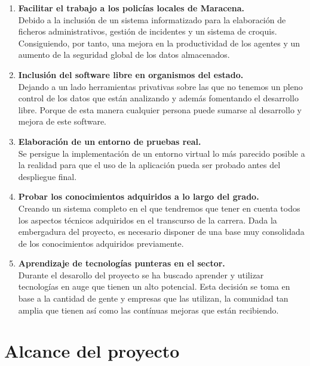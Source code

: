 \begin{enumerate}

    \item \textbf{Facilitar el trabajo a los policías locales de Maracena.}\\
    Debido a la inclusión de un sistema informatizado para la elaboración de 
    ficheros administrativos, gestión de incidentes y un sistema de croquis. Consiguiendo,
    por tanto, una mejora en la productividad de los agentes y un aumento de la seguridad
    global de los datos almacenados.
    
    \item \textbf{Inclusión del software libre en organismos del estado.}\\
    Dejando a un lado herramientas privativas sobre las que no tenemos un pleno control
    de los datos que están analizando y además fomentando el desarrollo libre. Porque 
    de esta manera cualquier persona puede sumarse al desarrollo y mejora de este software.

    \item \textbf{Elaboración de un entorno de pruebas real.}\\
    Se persigue la implementación de un entorno virtual lo más parecido posible a la 
    realidad para que el uso de la aplicación pueda ser probado antes del despliegue 
    final. 
   	
    \item \textbf{Probar los conocimientos adquiridos a lo largo del grado.}\\
    Creando un sistema completo en el que tendremos que tener en cuenta todos los 
    aspectos técnicos adquiridos en el transcurso de la carrera. Dada la embergadura del
    proyecto, es necesario disponer de una base muy consolidada de los conocimientos adquiridos
    previamente.
    	
	\cite{gplv3}

    \item \textbf{Aprendizaje de tecnologías punteras en el sector.}\\
    Durante el desarollo del proyecto se ha buscado aprender y utilizar tecnologías en 
    auge que tienen un alto potencial. Esta decisión se toma en base  a la cantidad de gente
    y empresas que las utilizan, la comunidad tan amplia que tienen así como las contínuas
    mejoras que están recibiendo.  

\end{enumerate}

\section{Alcance del proyecto}

